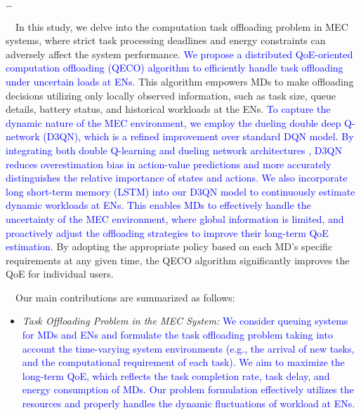 \documentclass[12pt,draftclsnofoot,onecolumn]{IEEEtran}
\newcommand{\rev}[1]{{\color{blue}#1}} %
\newcommand{\rev}[1]{#1}
\newenvironment{my}[2]%
{\begin{list}{}%
{\setlength{\rightmargin}{#1}\setlength{\leftmargin}{#2}}%


 \item[]{}

} {\end{list}}
\begin{document}
\begin{enumerate}
		\begin{my}{1cm}{1cm}
	\rev{
		{\dots\
			
			\color{black}


\,\,\,\,
In this study, we delve into the computation task offloading problem in MEC systems, where strict task processing deadlines and energy constraints can adversely affect the system performance.   \textcolor{blue}{We propose a distributed QoE-oriented computation offloading (QECO) algorithm to efficiently handle task offloading under uncertain loads at ENs.} This algorithm empowers MDs to make offloading decisions utilizing only locally observed information, such as task size, queue details, battery status, and historical workloads at the ENs. 
\textcolor{blue}{To capture the dynamic nature of the MEC environment, we employ the dueling double deep Q-network (D3QN), which is a refined improvement over standard DQN model. By integrating both double Q-learning \cite{van2016deep} and dueling network architectures \cite{wang2016dueling}, D3QN reduces overestimation bias in action-value predictions and more accurately distinguishes the relative importance of states and actions. We also incorporate long short-term memory (LSTM) \cite{hochreiter1997long} into our D3QN model to continuously estimate dynamic workloads at ENs. This enables MDs to effectively handle the uncertainty of the MEC environment, where global information is limited, and proactively adjust the offloading strategies to improve their long-term QoE estimation.} By adopting the appropriate policy based on each MD’s specific requirements at any given time, the QECO algorithm significantly improves the QoE for individual users. \vspace{3mm}

\,\,\,\,
Our main contributions are summarized as follows:


\begin{itemize}
	\item \textit{Task Offloading Problem in the MEC System:} \textcolor{blue}{ We consider queuing systems for MDs and ENs and formulate the task offloading problem taking into account the time-varying system environments (e.g., the arrival of new tasks, and the computational requirement of each task). We aim to maximize the long-term QoE, which reflects the task completion rate, task delay, and energy consumption of MDs. Our problem formulation effectively utilizes the resources and properly handles the dynamic fluctuations of workload at ENs. }


\end{itemize}}}
\end{my}
\end{enumerate}
\end{document}

